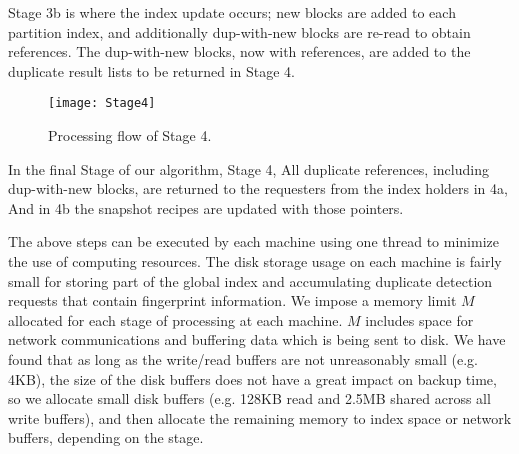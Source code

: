 Stage 3b is where the index update occurs; new blocks are added to each
partition index, and additionally dup-with-new blocks are re-read to obtain
references. The dup-with-new blocks, now with references, are added to the
duplicate result lists to be returned in Stage 4.

\begin{figure}[th]
\centering
\texttt{[image: Stage4]}
\caption{Processing flow of Stage 4.}
\label{fig:stage4}
\end{figure}

In the final Stage of our algorithm, Stage 4, All duplicate references,
including dup-with-new blocks, are returned to the requesters from the index
holders in 4a, And in 4b the snapshot recipes are updated with those pointers.


The above steps can be executed by each machine using one thread to minimize
the use of computing resources.
The  disk storage usage on each machine 
is fairly small for  storing part of the global index and
accumulating  duplicate detection requests that contain fingerprint information.   
We impose a memory limit $M$ allocated for each stage of processing at each machine.
$M$ includes space for network communications and buffering data which is being
sent to disk. We have found that as long as the write/read buffers are not
unreasonably small (e.g. 4KB), the size of the disk buffers does not have a
great impact on backup time, so we allocate small disk buffers (e.g. 128KB read
and 2.5MB shared across all write buffers), and then allocate the remaining
memory to index space or network buffers, depending on the stage.

